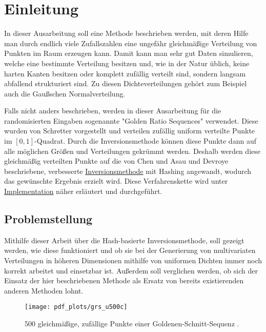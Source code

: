 \section{Einleitung}

In dieser Ausarbeitung soll eine Methode beschrieben werden, mit deren Hilfe man durch endlich viele Zufallszahlen 
eine ungefähr gleichmäßige Verteilung von Punkten im Raum erzeugen kann. Damit kann man sehr gut Daten simulieren, 
welche eine bestimmte Verteilung besitzen und, wie in der Natur üblich, keine harten Kanten besitzen oder komplett 
zufällig verteilt sind, sondern langsam abfallend strukturiert sind. Zu diesen Dichteverteilungen gehört zum Beispiel 
auch die Gaußschen Normalverteilung. 

Falls nicht anders beschrieben, werden in dieser Ausarbeitung für die randomisierten Eingaben sogenannte "Golden Ratio Sequences"
verwendet. Diese wurden von Schretter \cite{schretter-golden_ratio_sequences-2012} vorgestellt und verteilen zufällig 
uniform verteilte Punkte im $[0, 1]$-Quadrat. Durch die Inversionsmethode \cite{devroye-non_uniform_random_variate-1986} 
können diese Punkte dann auf alle möglichen Größen und Verteilungen gekrümmt werden. Deshalb werden diese gleichmäßig 
verteilten Punkte auf die von Chen und Asau \cite{chen_asau-generating_random_variates-1974} und Devroye 
\cite{devroye-non_uniform_random_variate-1986} beschriebene, verbesserte \hyperref[funktion]{Inversionsmethode} mit Hashing 
angewandt, wodurch das gewünschte Ergebnis erzielt wird. Diese Verfahrenskette wird unter \hyperref[impl]{Implementation} 
näher erläutert und durchgeführt. 


\subsection{Problemstellung}
Mithilfe dieser Arbeit über die Hash-basierte Inversionsmethode, soll gezeigt werden, wie diese funktioniert und ob  
sie bei der Generierung von multivariaten Verteilungen in höheren Dimensionen mithilfe von uniformen Dichten immer noch 
korrekt arbeitet und einsetzbar ist. Außerdem soll verglichen werden, ob sich der Einsatz der hier beschriebenen 
Methode als Ersatz von bereits existierenden anderen Methoden lohnt. 

\begin{figure}
    \centering
    \texttt{[image: pdf\_plots/grs\_u500c]}
    \caption{500 gleichmäßige, zufällige Punkte einer Goldenen-Schnitt-Sequenz \cite{schretter-golden_ratio_sequences-2012}.}
\end{figure}

